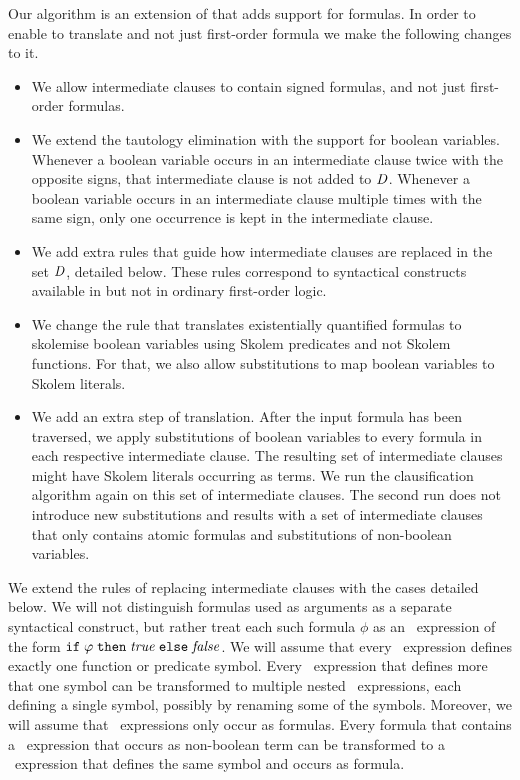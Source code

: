 Our algorithm is an extension of \newcnf{} that adds support for \folb{} formulas. In order to enable \newcnf{} to translate \folb{} and not just first-order formula we make the following changes to it.
\begin{itemize}
  \item We allow intermediate clauses to contain signed \folb{} formulas, and not just first-order formulas.
  \item We extend the \newcnf{} tautology elimination with the support for boolean variables. Whenever a boolean variable occurs in an intermediate clause twice with the opposite signs, that intermediate clause is not added to $\mathit{D}$. Whenever a boolean variable occurs in an intermediate clause multiple times with the same sign, only one occurrence is kept in the intermediate clause.
  \item We add extra rules that guide how intermediate clauses are replaced in the set $\mathit{D}$, detailed below. These rules correspond to syntactical constructs available in \folb{} but not in ordinary first-order logic.
  \item We change the rule that translates existentially quantified formulas to skolemise boolean variables using Skolem predicates and not Skolem functions. For that, we also allow substitutions to map boolean variables to Skolem literals. 
  \item We add an extra step of translation. After the input formula has been traversed, we apply substitutions of boolean variables to every formula in each respective intermediate clause. The resulting set of intermediate clauses might have Skolem literals occurring as terms. We run the clausification algorithm again on this set of intermediate clauses. The second run does not introduce new substitutions and results with a set of intermediate clauses that only contains atomic formulas and substitutions of non-boolean variables.
\end{itemize}

We extend the rules of replacing intermediate clauses with the cases detailed below. We will not distinguish formulas used as arguments as a separate syntactical construct, but rather treat each such formula $\phi$ as an \ITE\ expression of the form $\mathtt{if}\;{\varphi}\;\allowbreak\mathtt{then}\;{\mathit{true}}\;\allowbreak\mathtt{else}\;{\mathit{false}}$. We will assume that every \LETIN\ expression defines exactly one function or predicate symbol. Every \LETIN\ expression that defines more that one symbol can be transformed to multiple nested \LETIN\ expressions, each defining a single symbol, possibly by renaming some of the symbols. Moreover, we will assume that \LETIN\ expressions only occur as formulas. Every formula that contains a \LETIN\ expression that occurs as non-boolean term can be transformed to a \LETIN\ expression that defines the same symbol and occurs as formula. %

